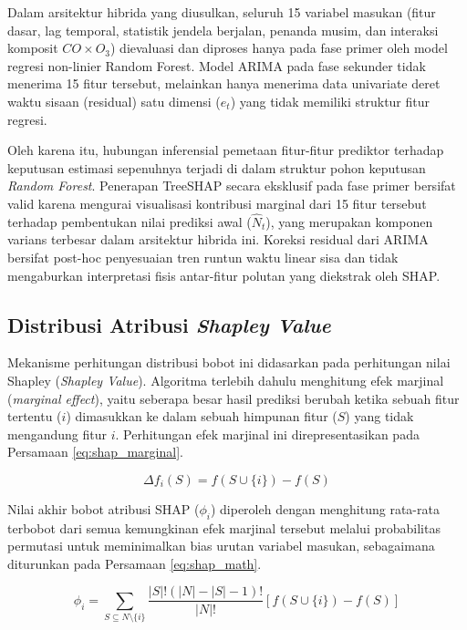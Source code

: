 Dalam arsitektur hibrida yang diusulkan, seluruh 15 variabel masukan (fitur dasar, lag temporal, statistik jendela berjalan, penanda musim, dan interaksi komposit $CO \times O_3$) dievaluasi dan diproses hanya pada fase primer oleh model regresi non-linier Random Forest. Model ARIMA pada fase sekunder tidak menerima 15 fitur tersebut, melainkan hanya menerima data univariate deret waktu sisaan (residual) satu dimensi ($e_t$) yang tidak memiliki struktur fitur regresi. 

Oleh karena itu, hubungan inferensial pemetaan fitur-fitur prediktor terhadap keputusan estimasi sepenuhnya terjadi di dalam struktur pohon keputusan \textit{Random Forest}. Penerapan TreeSHAP secara eksklusif pada fase primer bersifat valid karena mengurai visualisasi kontribusi marginal dari 15 fitur tersebut terhadap pembentukan nilai prediksi awal ($\hat{N}_t$), yang merupakan komponen varians terbesar dalam arsitektur hibrida ini. Koreksi residual dari ARIMA bersifat post-hoc penyesuaian tren runtun waktu linear sisa dan tidak mengaburkan interpretasi fisis antar-fitur polutan yang diekstrak oleh SHAP.

\subsection{Distribusi Atribusi \textit{Shapley Value}}

Mekanisme perhitungan distribusi bobot ini didasarkan pada perhitungan nilai Shapley (\textit{Shapley Value}). Algoritma terlebih dahulu menghitung efek marjinal (\textit{marginal effect}), yaitu seberapa besar hasil prediksi berubah ketika sebuah fitur tertentu ($i$) dimasukkan ke dalam sebuah himpunan fitur ($S$) yang tidak mengandung fitur $i$. Perhitungan efek marjinal ini direpresentasikan pada Persamaan \ref{eq:shap_marginal}.

\begin{equation}
\Delta f_i(S) = f(S \cup \{i\}) - f(S)
\label{eq:shap_marginal}
\end{equation}

Nilai akhir bobot atribusi SHAP ($\phi_i$) diperoleh dengan menghitung rata-rata terbobot dari semua kemungkinan efek marjinal tersebut melalui probabilitas permutasi untuk meminimalkan bias urutan variabel masukan, sebagaimana diturunkan pada Persamaan \ref{eq:shap_math}.

\begin{equation}
\phi_i = \sum_{S \subseteq N \setminus \{i\}} \frac{|S|!(|N|-|S|-1)!}{|N|!} \left[ f(S \cup \{i\}) - f(S) \right]
\label{eq:shap_math}
\end{equation}

